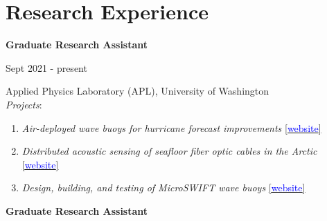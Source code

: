 \documentclass[letterpaper,11pt]{article}
\begin{document}
\section{Research Experience}
\vspace{-1pt}
%
\begin{minipage}[t]{.75\textwidth}
    \flushleft
    \textbf{Graduate Research Assistant}\\
    \end{minipage}
    \hfill
    \begin{minipage}[t]{.20\textwidth}
    \flushright
    Sept 2021 - present\\
\end{minipage}
Applied Physics Laboratory (APL), University of Washington %
\\
\textit{Projects}:
\begin{enumerate}[topsep=2pt,itemsep=-1ex,partopsep=1ex,parsep=1.25ex]
  \item \textit{Air-deployed wave buoys for hurricane forecast improvements} \href{https://nopphurricane.sofarocean.com/}{[\textcolor{blue}{website}]}
  \item \textit{Distributed acoustic sensing of seafloor fiber optic cables in the Arctic} \href{https://www2.whoi.edu/staff/madisonmsmith/persistent-measurements-of-surface-waves-in-landfast-ice/}{[\textcolor{blue}{website}]}
  \item \textit{Design, building, and testing of MicroSWIFT wave buoys} \href{https://apl.uw.edu/project/project.php?id=swift}{[\textcolor{blue}{website}]}
\end{enumerate}
%
\vspace{7pt}
%
\begin{minipage}[t]{.75\textwidth}
    \flushleft
    \textbf{Graduate Research Assistant}\\
    \end{minipage}
\end{document}
